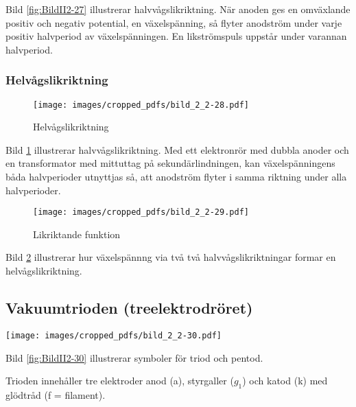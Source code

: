 Bild \ref{fig:BildII2-27} illustrerar halvvågslikriktning.
När anoden ges en omväxlande positiv och negativ potential, en växelspänning, så
flyter anodström under varje positiv halvperiod av växelspänningen.
En likströmspuls uppstår under varannan halvperiod.

\subsubsection{Helvågslikriktning}

\begin{figure}
\texttt{[image: images/cropped\_pdfs/bild\_2\_2-28.pdf]}
\caption{Helvågslikriktning}
\label{fig:BildII2-28}
\end{figure}

Bild \ref{fig:BildII2-28} illustrerar halvvågslikriktning.
Med ett elektronrör med dubbla anoder och en transformator med mittuttag på
sekundärlindningen, kan växelspänningens båda halvperioder utnyttjas så, att
anodström flyter i samma riktning under alla halvperioder.

\begin{figure}
\texttt{[image: images/cropped\_pdfs/bild\_2\_2-29.pdf]}
\caption{Likriktande funktion}
\label{fig:BildII2-29}
\end{figure}

Bild \ref{fig:BildII2-29} illustrerar hur växelspännng via två
två halvvågslikriktningar formar en helvågslikriktning.

\subsection{Vakuumtrioden (treelektrodröret)}

\begin{figure*}[ht]
\begin{center}
  \texttt{[image: images/cropped\_pdfs/bild\_2\_2-30.pdf]}
  \caption{Symboler för triod och pentod}
  \label{fig:BildII2-30}
\end{center}
\end{figure*}

Bild \ref{fig:BildII2-30} illustrerar symboler för triod och pentod.

Trioden innehåller tre elektroder anod (a), styrgaller (\(g_1\)) och katod (k)
med glödtråd (f = filament).

